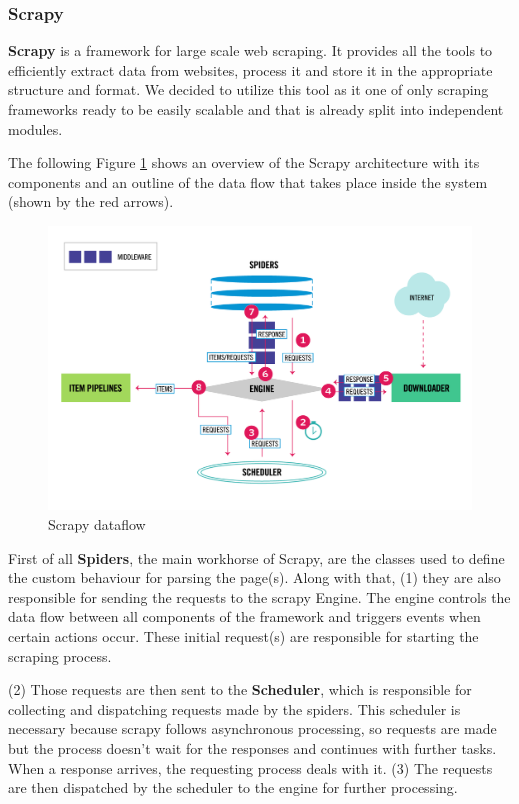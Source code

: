 \subsubsection{Scrapy}
\label{ss:scrapy}

\textbf{Scrapy} is a framework for large scale web scraping. It provides all the tools to efficiently extract data from websites, process it and store it in the appropriate structure and format. We decided to utilize this tool as it one of only scraping frameworks ready to be easily scalable and that is already split into independent modules.

The following Figure \ref{fig:scrapy-architecture} shows an overview of the Scrapy architecture with its components and an outline of the data flow that takes place inside the system (shown by the red arrows).

\begin{figure}[H]
	\centering
	\includegraphics[width=1\linewidth]{Chapters/img/2_background/scrapy_architecture.png}
	\caption{Scrapy dataflow \cite{scrapy-architecture}}
	\label{fig:scrapy-architecture}
\end{figure}

First of all \textbf{Spiders}, the main workhorse of Scrapy, are the classes used to define the custom behaviour for parsing the page(s). Along with that, (1) they are also responsible for sending the requests to the scrapy Engine. The engine controls the data flow between all components of the framework and triggers events when certain actions occur. These initial request(s) are responsible for starting the scraping process.

(2) Those requests are then sent to the \textbf{Scheduler}, which is responsible for collecting and dispatching requests made by the spiders. This scheduler is necessary because scrapy follows asynchronous processing, so requests are made but the process doesn't wait for the responses and continues with further tasks. When a response arrives, the requesting process deals with it. (3) The requests are then dispatched by the scheduler to the engine for further processing.

